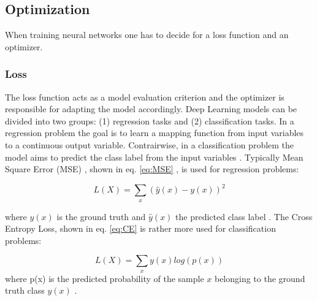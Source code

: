 \vskip 0.4in

\begin{minipage}{\linewidth}
\label{fig:activations_tanh}  
\end{minipage}

\subsection{Optimization}
When training neural networks one has to decide for a loss function and an optimizer. 

\subsubsection{Loss}
The loss function acts as a model evaluation criterion and the optimizer is responsible for adapting the model accordingly. Deep Learning models can be divided into two groups: (1) regression tasks and (2) classification tasks. In a regression problem the goal is to learn a mapping function from input variables to a continuous output variable. Contrairwise, in a classification problem the model aims to predict the class label from the input variables \cite{ShilohPerl2020}. Typically Mean Square Error (MSE) , shown in eq. \ref{eq:MSE} , is used for regression problems:

\begin{equation}
L(X) =  \sum_{x}(\hat{y}(x)-y(x))^2
\label{eq:MSE}
\end{equation}

where $y(x)$ is the ground truth and $\hat{y}(x)$ the predicted class label \cite{ShilohPerl2020}. The Cross Entropy Loss, shown in eq. \ref{eq:CE} is rather more used for classification problems: 

\begin{equation}
L(X) = \sum_{x} y(x) log(p(x))
\label{eq:CE}
\end{equation}
where p(x) is the predicted probability of the sample $x$ belonging to the ground truth class $y(x)$ \cite{ShilohPerl2020}.


